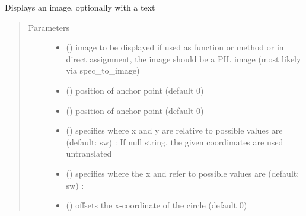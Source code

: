 \documentclass[letterpaper,10pt,english]{sphinxmanual}
\begin{document}

\begin{fulllineitems}
\label{\detokenize{Reference:salabim.AnimateImage}}
Displays an image, optionally with a text
\begin{quote}\begin{description}
\item[{Parameters}] \leavevmode\begin{itemize}
\item {} 
 () \textendash{} image to be displayed 
if used as function or method or in direct assigmnent,
the image should be a PIL image (most likely via spec\_to\_image)

\item {} 
 () \textendash{} position of anchor point (default 0)

\item {} 
 () \textendash{} position of anchor point (default 0)

\item {} 
 () \textendash{} specifies where x and y are relative to 
possible values are (default: sw) : 
If null string, the given coordimates are used untranslated

\item {} 
 () \textendash{} specifies where the x and refer to 
possible values are (default: sw) : 

\item {} 
 () \textendash{} offsets the x-coordinate of the circle (default 0)


\end{itemize}
\end{description}
\end{quote}
\end{fulllineitems}
\end{document}
